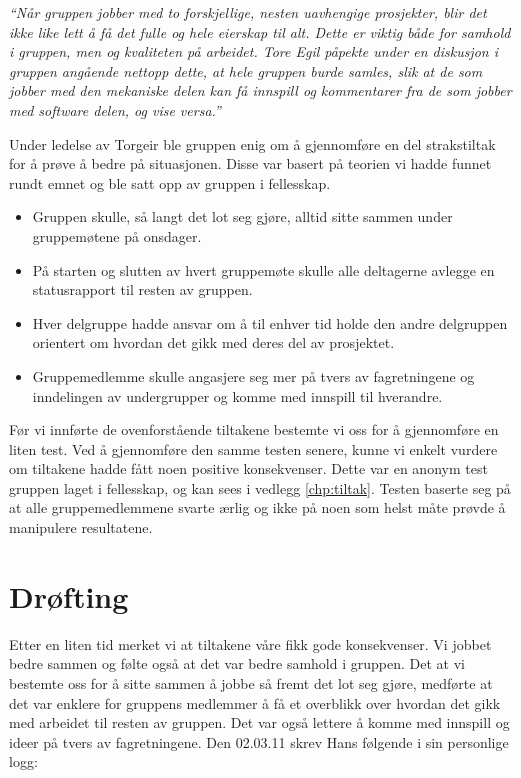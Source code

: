 \emph{``Når gruppen jobber med to forskjellige, nesten uavhengige prosjekter, blir det ikke like lett å få det fulle og hele eierskap til alt. Dette er viktig både for samhold i gruppen, men og kvaliteten på arbeidet. Tore Egil påpekte under en diskusjon i gruppen angående nettopp dette, at hele gruppen burde samles, slik at de som jobber med den mekaniske delen kan få innspill og kommentarer fra de som jobber med software delen, og vise versa.''}\newline

Under ledelse av Torgeir ble gruppen enig om å gjennomføre en del strakstiltak for å prøve å bedre på situasjonen. Disse var basert på teorien vi hadde funnet rundt emnet og ble satt opp av gruppen i fellesskap.

\begin{itemize}
\item Gruppen skulle, så langt det lot seg gjøre, alltid sitte sammen under gruppemøtene på onsdager. 
\item På starten og slutten av hvert gruppemøte skulle alle deltagerne avlegge en statusrapport til resten av gruppen. 
\item Hver delgruppe hadde ansvar om å til enhver tid holde den andre delgruppen orientert om hvordan det gikk med deres del av prosjektet.
\item Gruppemedlemme skulle angasjere seg mer på tvers av fagretningene og inndelingen av undergrupper og komme med innspill til hverandre. 
\end{itemize}

Før vi innførte de ovenforstående tiltakene bestemte vi oss for å gjennomføre en liten test. Ved å gjennomføre den samme testen senere, kunne vi enkelt vurdere om tiltakene hadde fått noen positive konsekvenser. Dette var en anonym test gruppen laget i fellesskap, og kan sees i vedlegg \ref{chp:tiltak}. Testen baserte seg på at alle gruppemedlemmene svarte ærlig og ikke på noen som helst måte prøvde å manipulere resultatene. 

\section{Drøfting}
Etter en liten tid merket vi at tiltakene våre fikk gode konsekvenser. Vi jobbet bedre sammen og følte også at det var bedre samhold i gruppen. 
Det at vi bestemte oss for å sitte sammen å jobbe så fremt det lot seg gjøre, medførte at det var enklere for gruppens medlemmer å få et overblikk over hvordan det gikk med arbeidet til resten av gruppen. Det var også lettere å komme med innspill og ideer på tvers av fagretningene. 
Den 02.03.11 skrev Hans følgende i sin personlige logg:\newline

